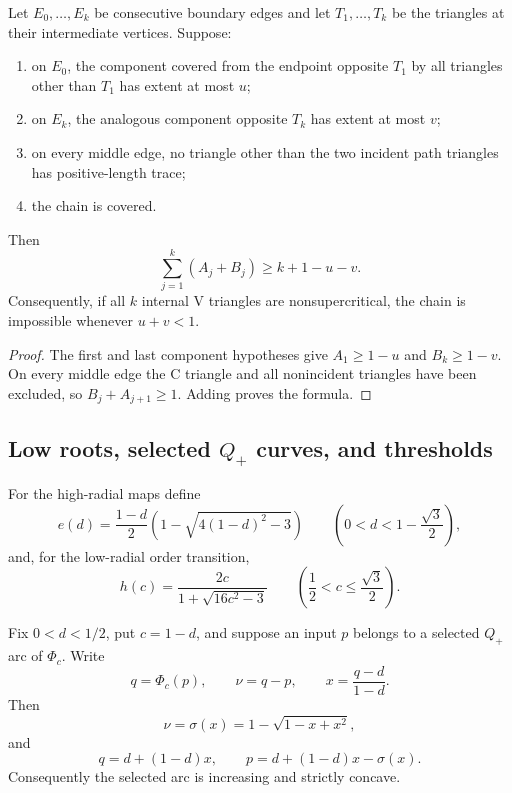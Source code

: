 \begin{lemma}
\label{lem:reader-boundary-path}
Let $E_0,\ldots,E_k$ be consecutive boundary edges and let
$T_1,\ldots,T_k$ be the triangles at their intermediate vertices.  Suppose:
\begin{enumerate}
\item on $E_0$, the component covered from the endpoint opposite $T_1$ by all
triangles other than $T_1$ has extent at most $u$;
\item on $E_k$, the analogous component opposite $T_k$ has extent at most $v$;
\item on every middle edge, no triangle other than the two incident path triangles has
positive-length trace;
\item the chain is covered.
\end{enumerate}
Then
\begin{equation}
 \sum_{j=1}^k(A_j+B_j)\ge k+1-u-v.
 \label{eq:reader-path-budget}
\end{equation}
Consequently, if all $k$ internal V triangles are nonsupercritical, the chain is
impossible whenever $u+v<1$.
\end{lemma}

\begin{proof}
The first and last component hypotheses give $A_1\ge1-u$ and
$B_k\ge1-v$.  On every middle edge the C triangle and all nonincident triangles have
been excluded, so $B_j+A_{j+1}\ge1$.  Adding proves the formula.
\end{proof}

\subsection{Low roots, selected \(Q_+\) curves, and thresholds}

For the high-radial maps define
\begin{equation}
 e(d)=\frac{1-d}{2}
 \left(1-\sqrt{4(1-d)^2-3}\right)
 \qquad\left(0<d<1-\frac{\sqrt3}{2}\right),
 \label{eq:signed-low-root-definition}
\end{equation}
and, for the low-radial order transition,
\begin{equation}
 h(c)=\frac{2c}{1+\sqrt{16c^2-3}}
 \qquad\left(\frac12<c\le\frac{\sqrt3}{2}\right).
 \label{eq:signed-order-transition}
\end{equation}

\begin{proposition}
\label{prop:reader-universal-tplus}
Fix $0<d<1/2$, put $c=1-d$, and suppose an input $p$ belongs to a selected
$Q_+$ arc of $\Phi_c$.  Write
\[
 q=\Phi_c(p),\qquad \nu=q-p,
 \qquad x=\frac{q-d}{1-d}.
\]
Then
\begin{equation}
 \nu=\sigma(x)=1-\sqrt{1-x+x^2},
 \label{eq:reader-psi}
\end{equation}
and
\begin{equation}
 q=d+(1-d)x,
 \qquad
 p=d+(1-d)x-\sigma(x).
 \label{eq:reader-tplus-normal}
\end{equation}
Consequently the selected arc is increasing and strictly concave.
\end{proposition}

